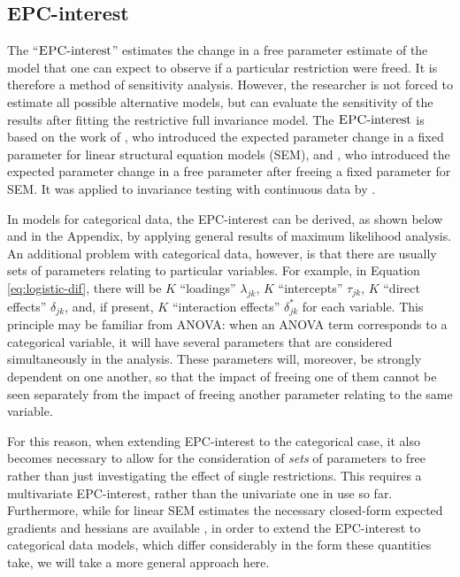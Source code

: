 \documentclass[letterpaper,12pt]{article}
\newcommand{\da}{\textrm{{\sc {EPC}}-interest}}
\begin{document}
\subsection{EPC-interest}
\label{sec:epc-interest}

The ``$\da$'' estimates the change in a free parameter estimate of the model that one can expect to observe if a particular restriction were freed. It is therefore a method of sensitivity analysis. However, the researcher is not forced to estimate all possible alternative models, but can evaluate the sensitivity of the results after fitting the restrictive full invariance model. 
The $\da{}$ is based on the work of \citet{saris_detection_1987}, who introduced the expected parameter change in a fixed parameter for linear structural equation models (SEM), and \citet{bentler1993some}, who introduced the expected parameter change in a free parameter after freeing a fixed parameter for SEM. It was applied to invariance testing with continuous data by \citet{Oberski:WP:EPC-interest}.

In models for categorical data, the EPC-interest can be derived, as shown below and in the Appendix, by applying general results of maximum likelihood analysis. An additional problem with categorical data, however, is that there are usually sets of parameters relating to particular variables. For example, in Equation \ref{eq:logistic-dif}, there will be $K$ ``loadings'' $\lambda_{jk}$, $K$ ``intercepts'' $\tau_{jk}$,  $K$ ``direct effects'' $\delta_{jk}$, and, if present, $K$ ``interaction effects'' $\delta^*_{jk}$ for each variable. This principle may be familiar from ANOVA: when an ANOVA term corresponds to a categorical variable, it will have several parameters that are considered simultaneously in the analysis. These parameters will, moreover, be strongly dependent on one another, so that the impact of freeing one of them cannot be seen separately from the impact of freeing another parameter relating to the same variable. 

For this reason, when extending EPC-interest to the categorical case, it also becomes necessary to allow for the consideration of \emph{sets} of parameters to free rather than just investigating the effect of single restrictions. This requires a multivariate EPC-interest, rather than the univariate one in use so far. Furthermore, while for linear SEM estimates the necessary closed-form expected gradients and hessians are available \citep{Oberski:WP:EPC-interest}, in order to extend the EPC-interest to categorical data models, which differ considerably in the form these quantities take, we will take a more general approach here.
\end{document}
